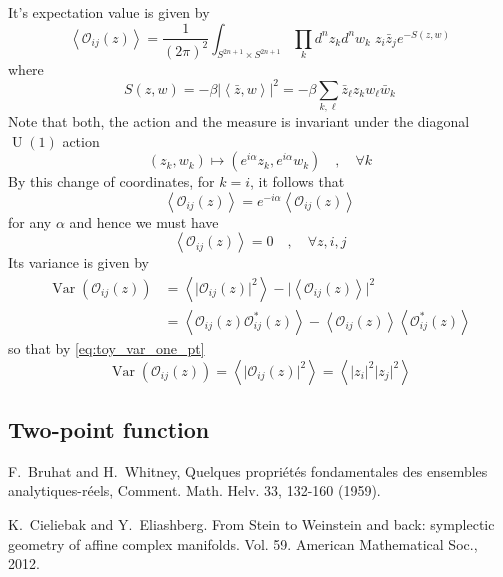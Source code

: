 \documentclass[a4paper,11pt]{article}
\theoremstyle{definition}
\DeclareMathOperator{\U}{U}
\DeclareMathOperator{\Var}{Var}
\newcommand{\OO}{\mathcal O}
\begin{document}
It's expectation value is given by
\begin{equation}
  \left\langle \OO_{ij}(z) \right\rangle = \frac{1}{(2\pi)^2} \int_{S^{2n+1}\times S^{2n+1}} \prod_k d^nz_k d^nw_k\; z_i \bar z_j e^{- S(z,w)}  
  \label{eq:toy_one_pt}
\end{equation}
where 
\begin{equation}
  S(z,w) = - \beta \lvert \left\langle \bar z, w \right\rangle \rvert^2 = - \beta \sum_{k,\ell} \bar z_{\ell} z_k w_{\ell} \bar w_{k} 
\end{equation}
Note that both, the action and the measure is invariant under the diagonal $\U(1)$ action 
\begin{equation}
  (z_k,w_k) \mapsto (e^{i\alpha}z_k, e^{i\alpha}w_k) \quad , \quad \forall k
\end{equation}
By this change of coordinates, for $k=i$, it follows that
\begin{equation}
  \left\langle \OO_{ij}(z) \right\rangle = e^{-i\alpha}\left\langle \OO_{ij}(z) \right\rangle
\end{equation}
for any $\alpha$ and hence we must have
\begin{equation}
  \boxed{
    \left\langle \OO_{ij}(z) \right\rangle = 0 \quad , \quad \forall z, i,j 
  }
  \label{eq:toy_var_one_pt}
\end{equation}
Its variance is given by
\begin{equation}
  \begin{split} 
    \Var(\OO_{ij}(z)) &= \left\langle \lvert \OO_{ij}(z)\rvert^2 \right\rangle  - \lvert \left\langle \OO_{ij}(z) \right\rangle \rvert^2 \\
    &= \left\langle \OO_{ij}(z)\OO^{*}_{ij}(z) \right\rangle - \left\langle \OO_{ij}(z) \right\rangle \left\langle \OO_{ij}^*(z) \right\rangle 
  \end{split}
\end{equation}
so that by \eqref{eq:toy_var_one_pt}
\begin{equation}
\Var(\OO_{ij}(z)) = \left\langle \lvert \OO_{ij}(z)\rvert^2 \right\rangle = \left\langle \lvert z_i \rvert^2 \lvert z_j \rvert^2 \right\rangle 
\end{equation}


\subsection{Two-point function}
\begin{thebibliography}{99}
   F.\ Bruhat and H.\ Whitney, Quelques propri\'et\'es fondamentales des ensembles analytiques-r\'eels, Comment. Math. Helv. 33, 132-160 (1959).

   K.\ Cieliebak and Y.\ Eliashberg. From Stein to Weinstein and back: symplectic geometry of affine complex manifolds. Vol. 59. American Mathematical Soc., 2012.
\end{thebibliography}
\end{document}
